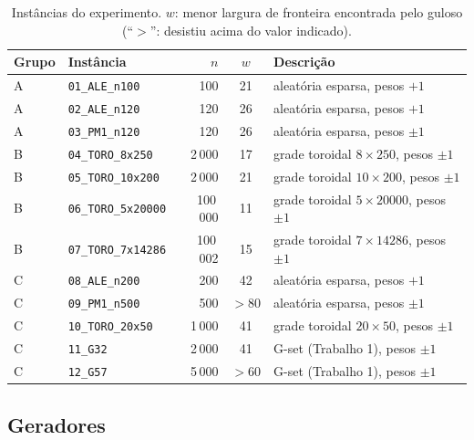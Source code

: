 \begin{table}[ht]\centering\footnotesize
\caption{Instâncias do experimento. $w$: menor largura de fronteira encontrada pelo guloso (``$>$'': desistiu acima do valor indicado).}\label{tab:familias}
\begin{tabular}{llrcl}\hline
Grupo & Instância & $n$ & $w$ & Descrição\\\hline
A & \texttt{01\_ALE\_n100} & 100 & 21 & aleatória esparsa, pesos $+1$\\
A & \texttt{02\_ALE\_n120} & 120 & 26 & aleatória esparsa, pesos $+1$\\
A & \texttt{03\_PM1\_n120} & 120 & 26 & aleatória esparsa, pesos $\pm1$\\
B & \texttt{04\_TORO\_8x250} & 2\,000 & 17 & grade toroidal $8\times250$, pesos $\pm1$\\
B & \texttt{05\_TORO\_10x200} & 2\,000 & 21 & grade toroidal $10\times200$, pesos $\pm1$\\
B & \texttt{06\_TORO\_5x20000} & 100\,000 & 11 & grade toroidal $5\times20000$, pesos $\pm1$\\
B & \texttt{07\_TORO\_7x14286} & 100\,002 & 15 & grade toroidal $7\times14286$, pesos $\pm1$\\
C & \texttt{08\_ALE\_n200} & 200 & 42 & aleatória esparsa, pesos $+1$\\
C & \texttt{09\_PM1\_n500} & 500 & $>80$ & aleatória esparsa, pesos $\pm1$\\
C & \texttt{10\_TORO\_20x50} & 1\,000 & 41 & grade toroidal $20\times50$, pesos $\pm1$\\
C & \texttt{11\_G32} & 2\,000 & 41 & G-set (Trabalho 1), pesos $\pm1$\\
C & \texttt{12\_G57} & 5\,000 & $>60$ & G-set (Trabalho 1), pesos $\pm1$\\\hline
\end{tabular}
\end{table}

\subsection{Geradores}


